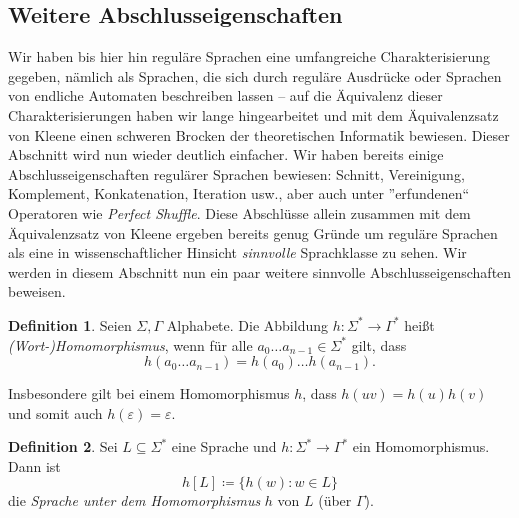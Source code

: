 \documentclass[11pt, a4paper]{article}
\theoremstyle{definition}
\newtheorem{definition}{Definition}[section]
\theoremstyle{plain}
\numberwithin{equation}{section}
\begin{document}
\subsection{Weitere Abschlusseigenschaften}\label{sec:regular_closure2}
Wir haben bis hier hin reguläre Sprachen eine umfangreiche Charakterisierung gegeben, nämlich als Sprachen, die sich durch reguläre Ausdrücke oder Sprachen von endliche Automaten beschreiben lassen -- auf die Äquivalenz dieser Charakterisierungen haben wir lange hingearbeitet und mit dem Ä\-qui\-va\-lenz\-satz von Kleene einen schweren Brocken der theoretischen Informatik bewiesen. Dieser Abschnitt wird nun wieder deutlich einfacher. Wir haben bereits einige Abschlusseigenschaften regulärer Sprachen bewiesen: Schnitt, Vereinigung, Komplement, Konkatenation, Iteration usw., aber auch unter ''erfundenen`` Operatoren wie \textit{Perfect Shuffle}. Diese Abschlüsse allein zusammen mit dem Äquivalenzsatz von Kleene ergeben bereits genug Gründe um reguläre Sprachen als eine in wissenschaftlicher Hinsicht \textit{sinnvolle} Sprachklasse zu sehen. Wir werden in diesem Abschnitt nun ein paar weitere sinnvolle Abschlusseigenschaften beweisen.\par
\begin{definition}\label{def:stringhomomorphism}
	Seien $\Sigma, \Gamma$ Alphabete. Die  Abbildung $h\colon \Sigma^\ast \to \Gamma^\ast$ heißt \textit{(Wort-)Ho\-mo\-mor\-phis\-mus}, wenn für alle $a_0 \ldots a_{n-1} \in \Sigma^\ast$ gilt, dass
	$$
		h(a_0 \ldots a_{n-1}) = h(a_0) \ldots h(a_{n-1}).
	$$
\end{definition}
Insbesondere gilt bei einem Homomorphismus $h$, dass $h(uv) = h(u)h(v)$ und somit auch $h(\varepsilon) = \varepsilon$.
\begin{definition}
	Sei $L \subseteq \Sigma^\ast$ eine Sprache und $h\colon \Sigma^\ast \to \Gamma^\ast$ ein Homomorphismus. Dann ist
	$$
		h[L] \coloneqq \{h(w) : w \in L\}
	$$
	die \textit{Sprache unter dem Homomorphismus} $h$ von $L$ (über $\Gamma$).
\end{definition}
\end{document}
